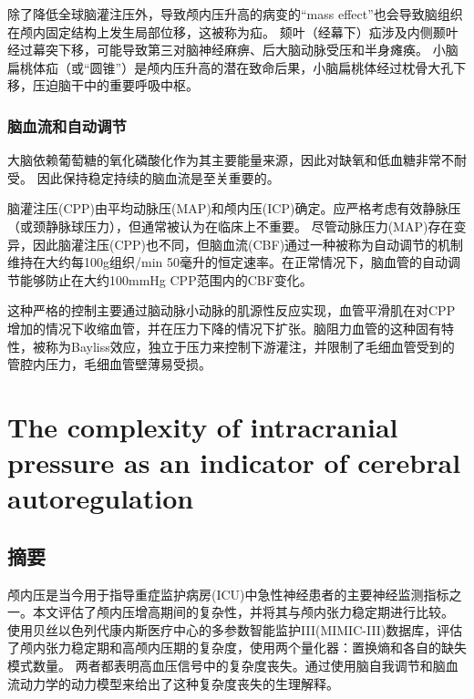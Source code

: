 \documentclass[titlepage,12pt]{article}
\begin{document}
除了降低全球脑灌注压外，导致颅内压升高的病变的“mass effect”也会导致脑组织在颅内固定结构上发生局部位移，这被称为疝。
颏叶（经幕下）疝涉及内侧颞叶经过幕突下移，可能导致第三对脑神经麻痹、后大脑动脉受压和半身瘫痪。
小脑扁桃体疝（或“圆锥”）是颅内压升高的潜在致命后果，小脑扁桃体经过枕骨大孔下移，压迫脑干中的重要呼吸中枢。
\subsubsection{脑血流和自动调节}
大脑依赖葡萄糖的氧化磷酸化作为其主要能量来源，因此对缺氧和低血糖非常不耐受。
因此保持稳定持续的脑血流是至关重要的。

脑灌注压(CPP)由平均动脉压(MAP)和颅内压(ICP)确定。应严格考虑有效静脉压（或颈静脉球压力），但通常被认为在临床上不重要。
尽管动脉压力(MAP)存在变异，因此脑灌注压(CPP)也不同，但脑血流(CBF)通过一种被称为自动调节的机制维持在大约每100g组织/min 50毫升的恒定速率。在正常情况下，脑血管的自动调节能够防止在大约100mmHg CPP范围内的CBF变化。

这种严格的控制主要通过脑动脉小动脉的肌源性反应实现，血管平滑肌在对CPP增加的情况下收缩血管，并在压力下降的情况下扩张。脑阻力血管的这种固有特性，被称为Bayliss效应，独立于压力来控制下游灌注，并限制了毛细血管受到的管腔内压力，毛细血管壁薄易受损。
\section{The complexity of intracranial pressure as an indicator of cerebral autoregulation}
\subsection{摘要}
颅内压是当今用于指导重症监护病房(ICU)中急性神经患者的主要神经监测指标之一。本文评估了颅内压增高期间的复杂性，并将其与颅内张力稳定期进行比较。
使用贝丝以色列代康内斯医疗中心的多参数智能监护III(MIMIC-III)数据库，评估了颅内张力稳定期和高颅内压期的复杂度，使用两个量化器：置换熵和各自的缺失模式数量。
两者都表明高血压信号中的复杂度丧失。通过使用脑自我调节和脑血流动力学的动力模型来给出了这种复杂度丧失的生理解释。
\end{document}
